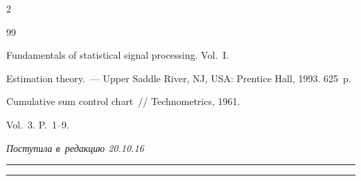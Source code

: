 \begin{multicols}{2}
{{\begin{thebibliography}{99}


     Fundamentals of statistical signal processing. Vol.~I. 


Estimation theory.~--- Upper Saddle River, NJ, USA: Prentice Hall, 1993. 625~p.







    Cumulative sum control chart~// Technometrics, 1961. 


Vol.~3. P.~1--9.


 \end{thebibliography}





 }


 }





\end{multicols}





\vspace*{-6pt}





\hfill{\small\textit{Поступила в~редакцию 20.10.16}}





\vspace*{8pt}















\hrule





\vspace*{2pt}





\hrule





\vspace*{8pt}








